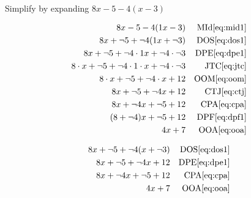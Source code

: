 \begin{example}[id:20141109-095536] \label{20141109-095536}  \hfill \\

Simplify by expanding $8x-5-4(x-3)$

\soln

\solnsteps
\begin{align*}
8x-5-4(1x-3) && \text{MId} \eqref{eq:mid1} \\
8x + \neg 5 + \neg 4(1x + \neg 3) && \text{DOS} \eqref{eq:dos1} \\
8x + \neg 5 + \neg 4 \cdot 1x + \neg 4 \cdot \neg 3 && \text{DPE} \eqref{eq:dpe1} \\ 
8 \cdot x + \neg 5 + \neg 4 \cdot 1 \cdot x + \neg 4 \cdot \neg 3 && \text{JTC} \eqref{eq:jtc} \\
8 \cdot x + \neg 5 + \neg 4 \cdot x + 12 && \text{OOM} \eqref{eq:oom} \\
8x + \neg 5 + \neg 4x + 12 && \text{CTJ} \eqref{eq:ctj} \\
8x + \neg 4x + \neg 5 + 12 && \text{CPA} \eqref{eq:cpa} \\
(8+\neg 4)x + \neg 5 + 12 && \text{DPF} \eqref{eq:dpf1} \\
4x + 7 && \text{OOA} \eqref{eq:ooa}
\end{align*}

\soln

\lesssteps
\begin{align*}
8x + \neg 5 + \neg 4(x+\neg 3) && \text{DOS} \eqref{eq:dos1} \\
8x + \neg 5 + \neg 4x + 12 && \text{DPE} \eqref{eq:dpe1} \\ 
8x + \neg 4x + \neg 5 + 12 && \text{CPA} \eqref{eq:cpa} \\
4x+7 && \text{OOA} \eqref{eq:ooa} 
\end{align*}

\end{example}


